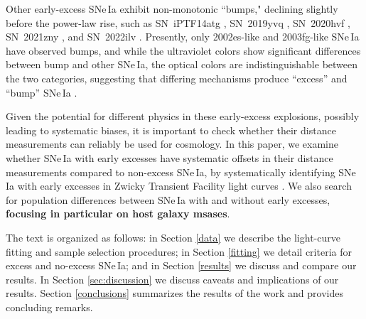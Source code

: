 \documentclass[twocolumn,twocolappendix, linenumbers]{aastex631} %
\begin{document}
Other early-excess SNe\,Ia exhibit non-monotonic ``bumps," declining slightly before the power-law rise, such as SN~iPTF14atg \citep{Kroner16}, SN~2019yvq \citep{Miller20}, SN~2020hvf \citep{Jiang21}, SN~2021zny \citep{Dimitriadis23}, and SN~2022ilv \citep{Srivastav23}. Presently, only 2002es-like and 2003fg-like SNe\,Ia have observed bumps, and while the ultraviolet colors show significant differences between bump and other SNe\,Ia, the optical colors are indistinguishable between the two categories, suggesting that differing mechanisms produce ``excess'' and ``bump'' SNe\,Ia \citep{Hoogendam23}.

Given the potential for different physics in these early-excess explosions, possibly leading to systematic biases, it is important to check whether their distance measurements can reliably be used for cosmology.  In this paper, we examine whether SNe\,Ia with early excesses have systematic offsets in their distance measurements compared to non-excess SNe\,Ia, by systematically identifying SNe\,Ia with early excesses in Zwicky Transient Facility light curves \citep[ZTF;][]{Bellm19}.  We also search for population differences between SNe\,Ia with and without early excesses, {\bf focusing in particular on host galaxy msases}.

The text is organized as follows: in Section \ref{data} we describe the light-curve fitting and sample selection procedures; in Section \ref{fitting} we detail criteria for excess and no-excess SNe\,Ia; and in Section \ref{results} we discuss and compare our results.  In Section \ref{sec:discussion} we discuss caveats and implications of our results.  Section \ref{conclusions} summarizes the results of the work and provides concluding remarks.
\end{document}
